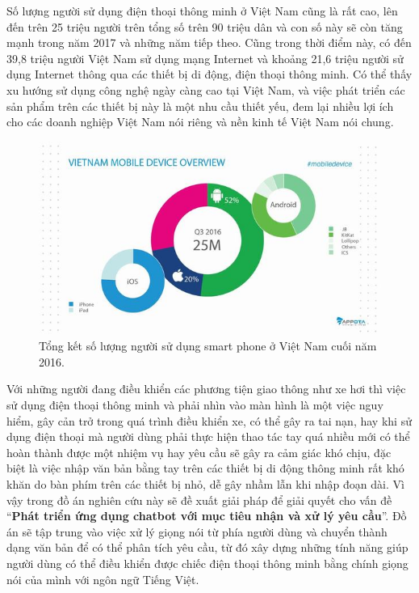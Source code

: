\documentclass[12pt]{report}
\begin{document}
Số lượng người sử dụng điện thoại thông minh ở Việt Nam cũng là rất cao, lên đến trên 25 triệu người trên tổng số trên 90 triệu dân và con số này sẽ còn tăng mạnh trong năm 2017 và những năm tiếp theo\cite{tech-report}. Cũng trong thời điểm này, có đến 39,8 triệu người Việt Nam sử dụng mạng Internet và khoảng 21,6 triệu người sử dụng Internet thông qua các thiết bị di động, điện thoại thông minh. Có thể thấy xu hướng sử dụng công nghệ ngày càng cao tại Việt Nam, và việc phát triển các sản phẩm trên các thiết bị này là một nhu cầu thiết yếu, đem lại nhiều lợi ích cho các doanh nghiệp Việt Nam nói riêng và nền kinh tế Việt Nam nói chung.

\begin{figure}[H]
  \centering
    \includegraphics[width=15cm]{Pics/Chap1/mobile-vietnam.jpg}
  \caption{Tổng kết số lượng người sử dụng smart phone ở Việt Nam cuối năm 2016\cite{tech-report}.}
\end{figure}

Với những người đang điều khiển các phương tiện giao thông như xe hơi thì việc sử dụng điện thoại thông minh và phải nhìn vào màn hình là một việc nguy hiểm, gây cản trở trong quá trình điều khiển xe, có thể gây ra tai nạn, hay khi sử dụng điện thoại mà người dùng phải thực hiện thao tác tay quá nhiều mới có thể hoàn thành được một nhiệm vụ hay yêu cầu sẽ gây ra cảm giác khó chịu, đặc biệt là việc nhập văn bản bằng tay trên các thiết bị di động thông minh rất khó khăn do bàn phím trên các thiết bị nhỏ, dễ gây nhầm lẫn khi nhập đoạn dài. Vì vậy trong đồ án nghiên cứu này sẽ đề xuất giải pháp để giải quyết cho vấn đề ``\textbf{Phát triển ứng dụng chatbot với mục tiêu nhận và xử lý yêu cầu}''. Đồ án sẽ tập trung vào việc xử lý giọng nói từ phía người dùng và chuyển thành dạng văn bản để có thể phân tích yêu cầu, từ đó xây dựng những tính năng giúp người dùng có thể điều khiển được chiếc điện thoại thông minh bằng chính giọng nói của mình với ngôn ngữ Tiếng Việt.
\end{document}
